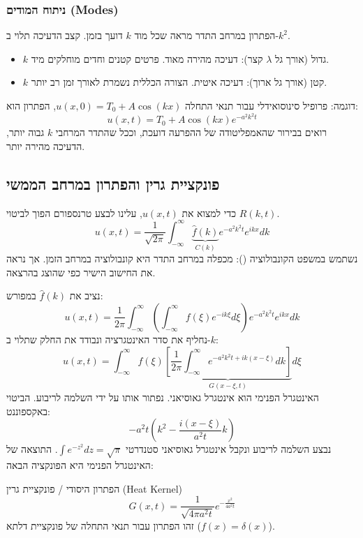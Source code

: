 \subsubsection{ניתוח המודים (Modes)}
הפתרון במרחב התדר מראה שכל מוד $k$ דועך בזמן. קצב הדעיכה תלוי ב-$k^2$.
\begin{itemize}
    \item $k$ גדול (אורך גל $\lambda$ קצר): דעיכה מהירה מאוד. פרטים קטנים וחדים מוחלקים מיד.
    \item $k$ קטן (אורך גל ארוך): דעיכה איטית. הצורה הכללית נשמרת לאורך זמן רב יותר.
\end{itemize}

\begin{examplebox}{דוגמה: פרופיל סינוסואידלי}
    עבור תנאי התחלה $u(x,0) = T_0 + A \cos(kx)$, הפתרון הוא:
    \[ u(x,t) = T_0 + A \cos(kx) e^{-a^2 k^2 t} \]
    רואים בבירור שהאמפליטודה של ההפרעה דועכת, וככל שהתדר המרחבי $k$ גבוה יותר, הדעיכה מהירה יותר.
\end{examplebox}

\subsection{פונקציית גרין והפתרון במרחב הממשי}
כדי למצוא את $u(x,t)$, עלינו לבצע טרנספורם הפוך לביטוי $R(k,t)$.
\[ u(x,t) = \frac{1}{\sqrt{2\pi}} \int_{-\infty}^{\infty} \underbrace{\hat{f}(k)}_{C(k)} e^{-a^2 k^2 t} e^{ikx} dk \]
נשתמש במשפט הקונבולוציה (): מכפלה במרחב התדר היא קונבולוציה במרחב הזמן. אך נראה את החישוב הישיר כפי שהוצג בהרצאה.

נציב את $\hat{f}(k)$ במפורש:
\[ u(x,t) = \frac{1}{2\pi} \int_{-\infty}^{\infty} \left( \int_{-\infty}^{\infty} f(\xi) e^{-ik\xi} d\xi \right) e^{-a^2 k^2 t} e^{ikx} dk \]
נחליף את סדר האינטגרציה ונבודד את החלק שתלוי ב-$k$:
\begin{equation}
    u(x,t) = \int_{-\infty}^{\infty} f(\xi) \underbrace{\left[ \frac{1}{2\pi} \int_{-\infty}^{\infty} e^{-a^2 k^2 t + ik(x-\xi)} dk \right]}_{G(x-\xi, t)} d\xi
\end{equation}
האינטגרל הפנימי הוא אינטגרל גאוסיאני. נפתור אותו על ידי השלמה לריבוע. הביטוי באקספוננט:
\[ -a^2 t \left( k^2 - \frac{i(x-\xi)}{a^2 t} k \right) \]
נבצע השלמה לריבוע ונקבל אינטגרל גאוסיאני סטנדרטי $\int e^{-z^2} dz = \sqrt{\pi}$.
התוצאה של האינטגרל הפנימי היא הפונקציה הבאה:

\begin{resultbox}{הפתרון היסודי / פונקציית גרין (Heat Kernel)}
    \begin{equation}
        G(x,t) = \frac{1}{\sqrt{4\pi a^2 t}} e^{-\frac{x^2}{4a^2 t}}
    \end{equation}
    זהו הפתרון עבור תנאי התחלה של פונקציית דלתא ($f(x) = \delta(x)$).
\end{resultbox}

